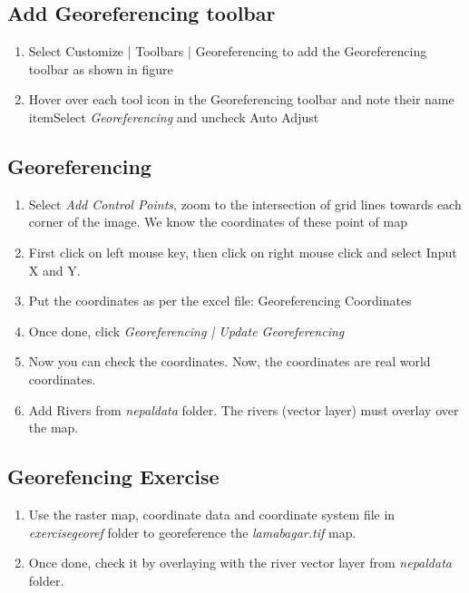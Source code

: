 \subsection{Add Georeferencing toolbar}
\begin{enumerate}
\item{Select Customize | Toolbars | Georeferencing to add the Georeferencing toolbar as shown in figure}
\item{Hover over each tool icon in the Georeferencing toolbar and note their name}
item{Select \emph{Georeferencing}  and uncheck Auto Adjust}
\end{enumerate}

\subsection{Georeferencing}
\begin{enumerate}
\item{Select \emph{Add Control Points}, zoom to the intersection of grid lines towards each corner of the image. We know the coordinates of these point of map}
\item{First click on left mouse key, then click on right mouse click and select Input X and Y.} 
\item{Put the coordinates as per the excel file: Georeferencing Coordinates}
\item{Once done, click \emph{Georeferencing | Update Georeferencing}}
\item{Now you can check the coordinates. Now, the coordinates are real world coordinates.}
\item{Add Rivers from \emph{nepal\textunderscore data} folder. The rivers (vector layer) must overlay over the map.}
\end{enumerate}

\subsection{Georefencing Exercise}
\begin{enumerate}
\item{Use the raster map, coordinate data and coordinate system file in \emph{exercise\textunderscore georef} folder to georeference the \emph{lamabagar.tif} map.}
\item{Once done, check it by overlaying with the river vector layer from \emph{nepal\textunderscore data} folder.}
\end{enumerate}

